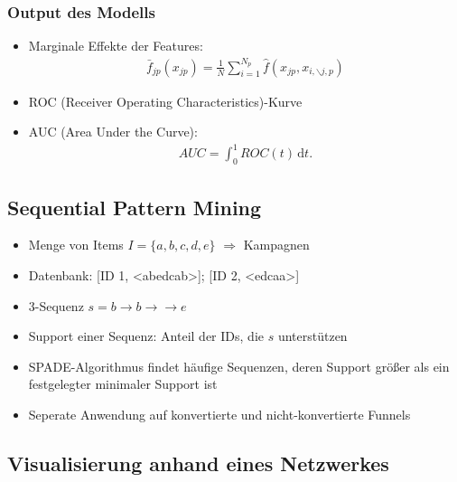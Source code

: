 \begin{frame}\frametitle{Output des Modells}
	\begin{itemize}
		\item Marginale Effekte der Features:
			\begin{align*}
				\bar{f}_{jp}(x_{jp}) = \frac{1}{N} \sum_{i=1}^{N_p} \hat{f}(x_{jp},x_{i,\backslash j,p})
			\end{align*}
		\item ROC (Receiver Operating Characteristics)-Kurve
		\item AUC (Area Under the Curve):
			\begin{align*}
				AUC = \int_0^1 \! ROC(t) \, \mathrm{d}t.
			\end{align*}
	\end{itemize}
\end{frame}

\subsection{Sequential Pattern Mining}

\begin{frame}
	\begin{itemize}
		\item Menge von Items $I = \{a, b, c, d, e\}$ $\Rightarrow$ Kampagnen
		\item Datenbank: [ID 1, <abedcab>]; [ID 2, <edcaa>]
		\item 3-Sequenz $s = b\rightarrow b\rightarrow \rightarrow e$
		\item Support einer Sequenz: Anteil der IDs, die $s$ unterstützen
		\item SPADE-Algorithmus findet häufige Sequenzen, deren Support größer als ein festgelegter minimaler Support ist
		\item Seperate Anwendung auf konvertierte und nicht-konvertierte Funnels
	\end{itemize}
\end{frame}

\subsection{Visualisierung anhand eines Netzwerkes}

